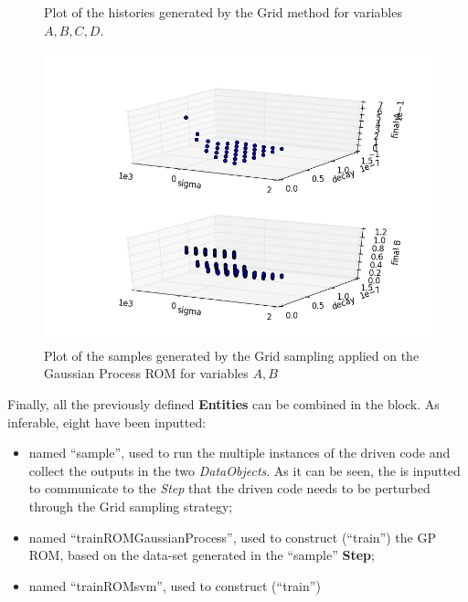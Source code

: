 \begin{enumerate}
\begin{figure}[h!]
  \caption{Plot of the histories generated by the Grid method for variables $A,B,C,D$.}
  \label{fig:ROMgrid_histories}
 \end{figure}
 \begin{figure}[h!]
  \centering
  \includegraphics[scale=0.7]{pics/samplesPlot3DROMgp_scatter-scatter.png}
  \caption{Plot of the samples generated by the Grid sampling applied on the Gaussian Process ROM for variables $A,B$}
  \label{fig:ROMgp_samples}
 \end{figure}
   Finally, all the previously defined \textbf{Entities} can be combined in
   the  block. As inferable,
   eight  have been inputted:
   \begin{itemize}
     \item {} named ``sample'', used to run the multiple
     instances of the driven code and
     collect the outputs in the two \textit{DataObjects}. As it can be
     seen, the  is inputted to communicate to the
     \textit{Step} that the driven code needs to
     be perturbed through the Grid sampling strategy;
     \item {} named ``trainROMGaussianProcess'', used to construct (``train'')
     the GP ROM, based on the data-set generated in the  ``sample'' \textbf{Step};
     \item {} named ``trainROMsvm'', used to construct (``train'')

\end{itemize}
\end{enumerate}

